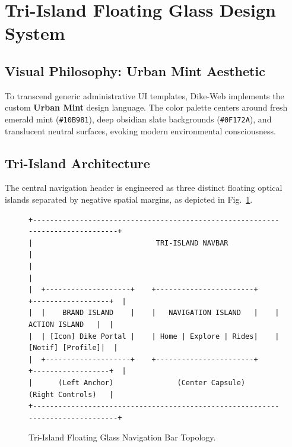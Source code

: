 \documentclass[conference,10pt,a4paper]{IEEEtran}
\begin{document}
\section{Tri-Island Floating Glass Design System}

\subsection{Visual Philosophy: Urban Mint Aesthetic}
To transcend generic administrative UI templates, Dike-Web implements the custom \textbf{Urban Mint} design language. The color palette centers around fresh emerald mint (\texttt{\#10B981}), deep obsidian slate backgrounds (\texttt{\#0F172A}), and translucent neutral surfaces, evoking modern environmental consciousness.

\subsection{Tri-Island Architecture}
The central navigation header is engineered as three distinct floating optical islands separated by negative spatial margins, as depicted in Fig.~\ref{fig:tri_island}.

\begin{figure}[!ht]
\centering
\begin{lstlisting}[basicstyle=\ttfamily\fontsize{6pt}{7pt}\selectfont,frame=single,numbers=none]
+-------------------------------------------------------------------------------+
|                             TRI-ISLAND NAVBAR                                 |
|                                                                               |
|  +--------------------+    +-----------------------+    +------------------+  |
|  |    BRAND ISLAND    |    |   NAVIGATION ISLAND   |    |  ACTION ISLAND   |  |
|  | [Icon] Dike Portal |    | Home | Explore | Rides|    | [Notif] [Profile]|  |
|  +--------------------+    +-----------------------+    +------------------+  |
|      (Left Anchor)               (Center Capsule)          (Right Controls)   |
+-------------------------------------------------------------------------------+
\end{lstlisting}
\caption{Tri-Island Floating Glass Navigation Bar Topology.}
\label{fig:tri_island}
\end{figure}
\end{document}
